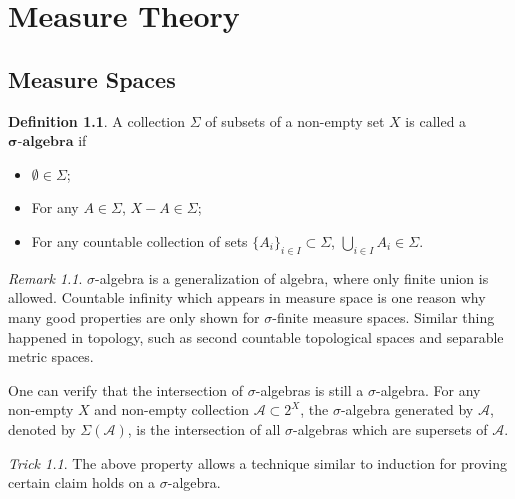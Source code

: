 \documentclass[openany]{book}
\theoremstyle{definition}
\newtheorem{definition}{Definition}[chapter]
\theoremstyle{remark}
\newtheorem*{remark}{Remark}
\newtheorem*{trick}{Trick}
\begin{document}
\chapter{Measure Theory}\label{chp:measure}
\section{Measure Spaces}
\begin{definition}
    A collection $\Sigma$ of subsets of a non-empty set $X$ is called a $\boldsymbol{\sigma}\textbf{-algebra}$ if
    \begin{itemize}
        \item $\emptyset\in\Sigma$;
        \item For any $A\in\Sigma$, $X-A\in\Sigma$;
        \item For any countable collection of sets $\{A_i\}_{i\in I}\subset\Sigma$, $\bigcup_{i\in I}A_i\in\Sigma$.
    \end{itemize}
\end{definition}
\begin{remark}
    $\sigma$-algebra is a generalization of algebra, where only finite union is allowed. Countable infinity which appears in measure space is one reason why many good properties are only shown for $\sigma$-finite measure spaces. Similar thing happened in topology, such as second countable topological spaces and separable metric spaces.
\end{remark}
One can verify that the intersection of $\sigma$-algebras is still a $\sigma$-algebra. For any non-empty $X$ and non-empty collection $\mathcal{A}\subset 2^X$, the $\sigma$-algebra generated by $\mathcal{A}$, denoted by $\Sigma(\mathcal{A})$, is the intersection of all $\sigma$-algebras which are supersets of $\mathcal{A}$.
\begin{trick}
    The above property allows a technique similar to induction for proving certain claim holds on a $\sigma$-algebra.
\end{trick}
\end{document}
